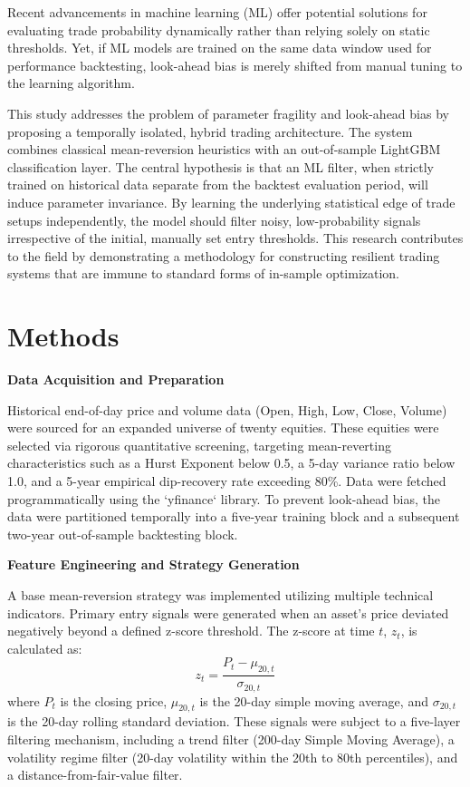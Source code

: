 \documentclass[12pt]{article}
\begin{document}
Recent advancements in machine learning (ML) offer potential solutions for evaluating trade probability dynamically rather than relying solely on static thresholds. Yet, if ML models are trained on the same data window used for performance backtesting, look-ahead bias is merely shifted from manual tuning to the learning algorithm. 

This study addresses the problem of parameter fragility and look-ahead bias by proposing a temporally isolated, hybrid trading architecture. The system combines classical mean-reversion heuristics with an out-of-sample LightGBM classification layer. The central hypothesis is that an ML filter, when strictly trained on historical data separate from the backtest evaluation period, will induce parameter invariance. By learning the underlying statistical edge of trade setups independently, the model should filter noisy, low-probability signals irrespective of the initial, manually set entry thresholds. This research contributes to the field by demonstrating a methodology for constructing resilient trading systems that are immune to standard forms of in-sample optimization.

\section*{Methods}

\textbf{Data Acquisition and Preparation}

Historical end-of-day price and volume data (Open, High, Low, Close, Volume) were sourced for an expanded universe of twenty equities. These equities were selected via rigorous quantitative screening, targeting mean-reverting characteristics such as a Hurst Exponent below 0.5, a 5-day variance ratio below 1.0, and a 5-year empirical dip-recovery rate exceeding 80\%. Data were fetched programmatically using the `yfinance` library. To prevent look-ahead bias, the data were partitioned temporally into a five-year training block and a subsequent two-year out-of-sample backtesting block. 

\textbf{Feature Engineering and Strategy Generation}

A base mean-reversion strategy was implemented utilizing multiple technical indicators. Primary entry signals were generated when an asset's price deviated negatively beyond a defined z-score threshold. The z-score at time $t$, $z_t$, is calculated as:
\begin{equation}
z_t = \frac{P_t - \mu_{20,t}}{\sigma_{20,t}}
\end{equation}
where $P_t$ is the closing price, $\mu_{20,t}$ is the 20-day simple moving average, and $\sigma_{20,t}$ is the 20-day rolling standard deviation. These signals were subject to a five-layer filtering mechanism, including a trend filter (200-day Simple Moving Average), a volatility regime filter (20-day volatility within the 20th to 80th percentiles), and a distance-from-fair-value filter.
\end{document}
